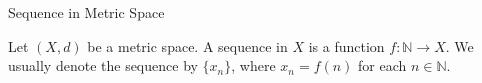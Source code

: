 \documentclass[12pt, a4paper]{article}
\begin{document}
\FrontPage
\Large


\begin{heading}
    Sequence in Metric Space
\end{heading}

\vspace{10pt}

\begin{definition}
    Let $(X, d)$ be a metric space. A sequence in $X$ is a function $f: \mathbb{N} \to X$. We usually denote the sequence by $\{x_n\}$, where $x_n = f(n)$ for each $n \in \mathbb{N}$.
\end{definition}



\clearpage

\EndPage
\end{document}
